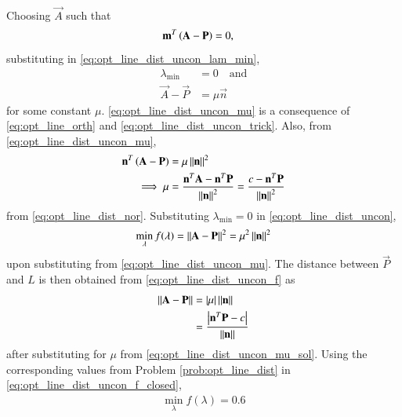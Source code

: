 \begin{enumerate}[label=\arabic*.,ref=\thesection.\theenumi]
\begin{align}
\label{eq:opt_line_dist_uncon_lam_min}
\end{align}
%
Choosing $\vec{A}$ such that 
%
\begin{align}
\mathbf{m}^T\left(\mathbf{A} -\mathbf{P}\right) &= 0,
\label{eq:opt_line_dist_uncon_trick}
\end{align}
%
substituting in \eqref{eq:opt_line_dist_uncon_lam_min},
%
\begin{align}
\label{eq:opt_line_dist_uncon_lam0}
\lambda_{\min} &= 0 \quad \text{and}
\\
\vec{A} -\vec{P} &= \mu \vec{n}
\label{eq:opt_line_dist_uncon_mu}
\end{align}
for some constant $\mu$. \eqref{eq:opt_line_dist_uncon_mu}
 is a consequence of \eqref{eq:opt_line_orth} and \eqref{eq:opt_line_dist_uncon_trick}. Also, from 
\eqref{eq:opt_line_dist_uncon_mu},
%
\begin{align}
\mathbf{n}^T\left(\mathbf{A} -\mathbf{P} \right) &= \mu \left\lVert\mathbf{n}\right\rVert^2
\\
\implies \mu & = \frac{\mathbf{n}^T\mathbf{A} -\mathbf{n}^T\mathbf{P} }{\left\lVert\mathbf{n}\right\rVert^2} = \frac{c -\mathbf{n}^T\mathbf{P} }{\left\lVert\mathbf{n}\right\rVert^2}
\label{eq:opt_line_dist_uncon_mu_sol}
\end{align}
%
from \eqref{eq:opt_line_dist_nor}.
Substituting $\lambda_{\min} = 0$ in \eqref{eq:opt_line_dist_uncon},
%
\begin{align}
\min_{\lambda}f(\lambda) =  \left\lVert\mathbf{A} -\mathbf{P}\right\rVert^2 = \mu^2\left\lVert\mathbf{n}\right\rVert^2
\label{eq:opt_line_dist_uncon_f}
\end{align}
upon substituting from \eqref{eq:opt_line_dist_uncon_mu}. The distance between $\vec{P}$ and ${L}$ is then obtained from \eqref{eq:opt_line_dist_uncon_f} as
\begin{align}
\left\lVert\mathbf{A} -\mathbf{P}\right\rVert &= \left\vert\mu\right\vert\left\lVert\mathbf{n}\right\rVert
\\
&= \frac{\left\vert\mathbf{n}^T\mathbf{P} -c \right\vert}{\left\lVert\mathbf{n}\right\rVert}
\label{eq:opt_line_dist_uncon_f_closed}
\end{align}
after substituting for $\mu$ from  \eqref{eq:opt_line_dist_uncon_mu_sol}. Using the corresponding values from Problem \eqref{prob:opt_line_dist} in \eqref{eq:opt_line_dist_uncon_f_closed},
%
\begin{align}
\min_{\lambda}f(\lambda) =  0.6
\end{align}

%
%
\end{enumerate}

